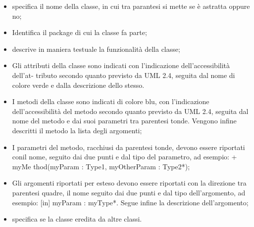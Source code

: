 \begin{itemize}
\item {}specifica il nome della classe, in cui tra parantesi si mette se è astratta oppure no;
\item {} Identifica il package di cui la classe fa parte;
\item {}descrive in maniera testuale la funzionalità della classe;
\item {}Gli attributi della classe sono indicati con l’indicazione dell’accessibilità dell’at-
tributo secondo quanto previsto da UML 2.4, seguita dal nome di colore verde e
dalla descrizione dello stesso.
\item {}I metodi della classe sono indicati di colore blu, con l’indicazione dell’accessibilità
del metodo secondo quanto previsto da UML 2.4, seguita dal nome del metodo e
dai suoi parametri tra parentesi tonde.
Vengono infine descritti il metodo  la lista degli argomenti;
\item {} I parametri del metodo, racchiusi da parentesi tonde, devono essere riportati conil nome, seguito dai due punti e dal tipo del parametro, ad esempio: + myMe
thod(myParam : Type1, myOtherParam : Type2*);
\item {}Gli argomenti riportati per esteso devono essere riportati con la direzione tra
parentesi quadre, il nome seguito dai due punti e dal tipo dell’argomento, ad
esempio: [in] myParam : myType*. Segue infine la descrizione dell’argomento;

\item {}specifica se la classe eredita da altre classi.
\end{itemize}

